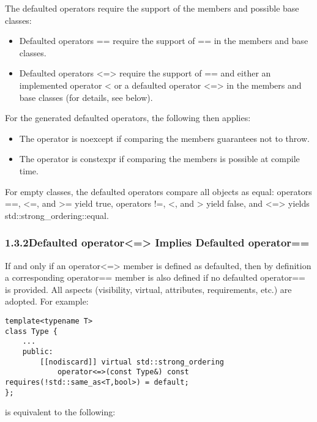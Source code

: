 The defaulted operators require the support of the members and possible base classes:

\begin{itemize}
\item
Defaulted operators == require the support of == in the members and base classes.

\item
Defaulted operators <=> require the support of == and either an implemented operator < or a defaulted operator <=> in the members and base classes (for details, see below).
\end{itemize}

For the generated defaulted operators, the following then applies:

\begin{itemize}
\item
The operator is noexcept if comparing the members guarantees not to throw.

\item
The operator is constexpr if comparing the members is possible at compile time.
\end{itemize}

For empty classes, the defaulted operators compare all objects as equal: operators ==, <=, and >= yield true, operators !=, <, and > yield false, and <=> yields std::strong\_ordering::equal.


\subsubsection*{ 1.3.2\hspace{0.2cm}Defaulted operator<=> Implies Defaulted operator==}

If and only if an operator<=> member is defined as defaulted, then by definition a corresponding operator== member is also defined if no defaulted operator== is provided. All aspects (visibility, virtual, attributes, requirements, etc.) are adopted. For example:

\begin{lstlisting}[style=styleCXX]
template<typename T>
class Type {
	...
	public:
		[[nodiscard]] virtual std::strong_ordering
			operator<=>(const Type&) const requires(!std::same_as<T,bool>) = default;
};
\end{lstlisting}

is equivalent to the following:

